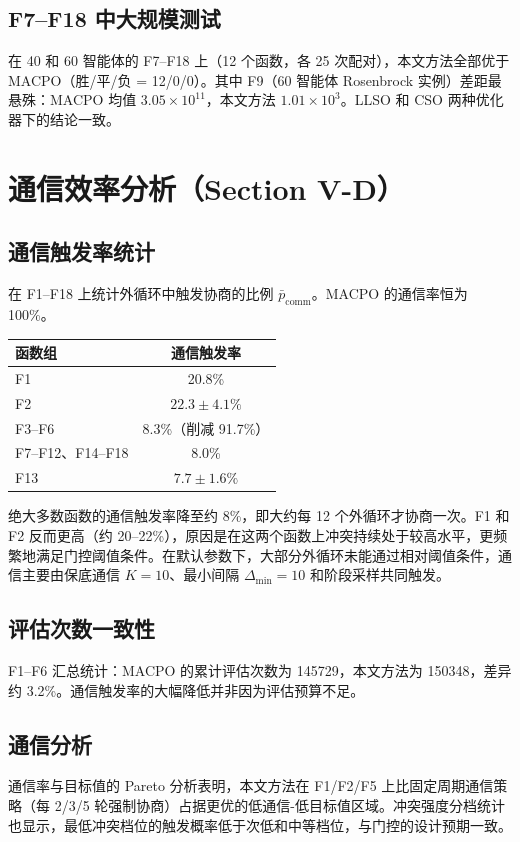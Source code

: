 \documentclass[11pt,a4paper]{ctexart}
\begin{document}
\subsection{F7--F18 中大规模测试}
在 40 和 60 智能体的 F7--F18 上（12 个函数，各 25 次配对），本文方法全部优于 MACPO（胜/平/负 = 12/0/0）。其中 F9（60 智能体 Rosenbrock 实例）差距最悬殊：MACPO 均值 $3.05\times10^{11}$，本文方法 $1.01\times10^3$。LLSO 和 CSO 两种优化器下的结论一致。

\section{通信效率分析（Section V-D）}

\subsection{通信触发率统计}
在 F1--F18 上统计外循环中触发协商的比例 $\bar p_{\mathrm{comm}}$。MACPO 的通信率恒为 100\%。

\begin{center}\small
\begin{tabular}{@{}lc@{}}
\toprule
函数组 & 通信触发率 \\
\midrule
F1 & 20.8\% \\
F2 & $22.3\pm4.1\%$ \\
F3--F6 & 8.3\%（削减 91.7\%） \\
F7--F12、F14--F18 & 8.0\% \\
F13 & $7.7\pm1.6\%$ \\
\bottomrule
\end{tabular}
\end{center}

绝大多数函数的通信触发率降至约 8\%，即大约每 12 个外循环才协商一次。F1 和 F2 反而更高（约 20--22\%），原因是在这两个函数上冲突持续处于较高水平，更频繁地满足门控阈值条件。在默认参数下，大部分外循环未能通过相对阈值条件，通信主要由保底通信 $K=10$、最小间隔 $\Delta_{\min}=10$ 和阶段采样共同触发。

\subsection{评估次数一致性}
F1--F6 汇总统计：MACPO 的累计评估次数为 145729，本文方法为 150348，差异约 3.2\%。通信触发率的大幅降低并非因为评估预算不足。

\subsection{通信分析}
通信率与目标值的 Pareto 分析表明，本文方法在 F1/F2/F5 上比固定周期通信策略（每 2/3/5 轮强制协商）占据更优的低通信-低目标值区域。冲突强度分档统计也显示，最低冲突档位的触发概率低于次低和中等档位，与门控的设计预期一致。
\end{document}
